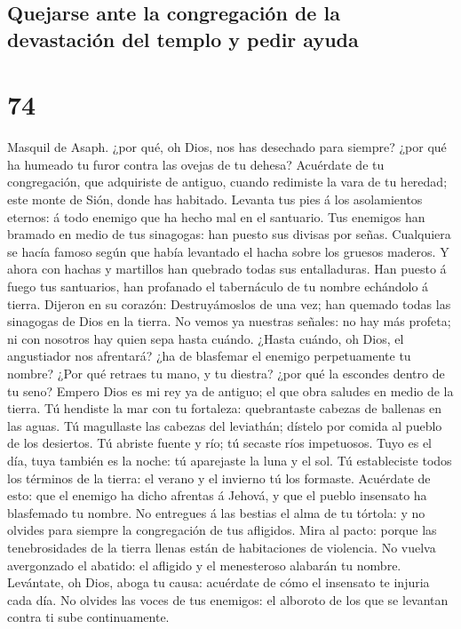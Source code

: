 \hypertarget{quejarse-ante-la-congregaciuxf3n-de-la-devastaciuxf3n-del-templo-y-pedir-ayuda}{%
\subsection{Quejarse ante la congregación de la devastación del templo y
pedir
ayuda}\label{quejarse-ante-la-congregaciuxf3n-de-la-devastaciuxf3n-del-templo-y-pedir-ayuda}}

\hypertarget{section-73}{%
\section{74}\label{section-73}}

 Masquil de Asaph. ¿por qué, oh Dios, nos has desechado
para siempre? ¿por qué ha humeado tu furor contra las ovejas de tu
dehesa?  Acuérdate de tu congregación, que adquiriste de
antiguo, cuando redimiste la vara de tu heredad; este monte de Sión,
donde has habitado.  Levanta tus pies á los asolamientos
eternos: á todo enemigo que ha hecho mal en el santuario. 
Tus enemigos han bramado en medio de tus sinagogas: han puesto sus
divisas por señas.  Cualquiera se hacía famoso según que
había levantado el hacha sobre los gruesos maderos.  Y
ahora con hachas y martillos han quebrado todas sus entalladuras.
 Han puesto á fuego tus santuarios, han profanado el
tabernáculo de tu nombre echándolo á tierra.  Dijeron en
su corazón: Destruyámoslos de una vez; han quemado todas las sinagogas
de Dios en la tierra.  No vemos ya nuestras señales: no
hay más profeta; ni con nosotros hay quien sepa hasta cuándo.
 ¿Hasta cuándo, oh Dios, el angustiador nos afrentará?
¿ha de blasfemar el enemigo perpetuamente tu nombre? 
¿Por qué retraes tu mano, y tu diestra? ¿por qué la escondes dentro de
tu seno?  Empero Dios es mi rey ya de antiguo; el que
obra saludes en medio de la tierra.  Tú hendiste la mar
con tu fortaleza: quebrantaste cabezas de ballenas en las aguas.
 Tú magullaste las cabezas del leviathán; dístelo por
comida al pueblo de los desiertos.  Tú abriste fuente y
río; tú secaste ríos impetuosos.  Tuyo es el día, tuya
también es la noche: tú aparejaste la luna y el sol.  Tú
estableciste todos los términos de la tierra: el verano y el invierno tú
los formaste.  Acuérdate de esto: que el enemigo ha dicho
afrentas á Jehová, y que el pueblo insensato ha blasfemado tu nombre.
 No entregues á las bestias el alma de tu tórtola: y no
olvides para siempre la congregación de tus afligidos. 
Mira al pacto: porque las tenebrosidades de la tierra llenas están de
habitaciones de violencia.  No vuelva avergonzado el
abatido: el afligido y el menesteroso alabarán tu nombre.
 Levántate, oh Dios, aboga tu causa: acuérdate de cómo el
insensato te injuria cada día.  No olvides las voces de
tus enemigos: el alboroto de los que se levantan contra ti sube
continuamente.

